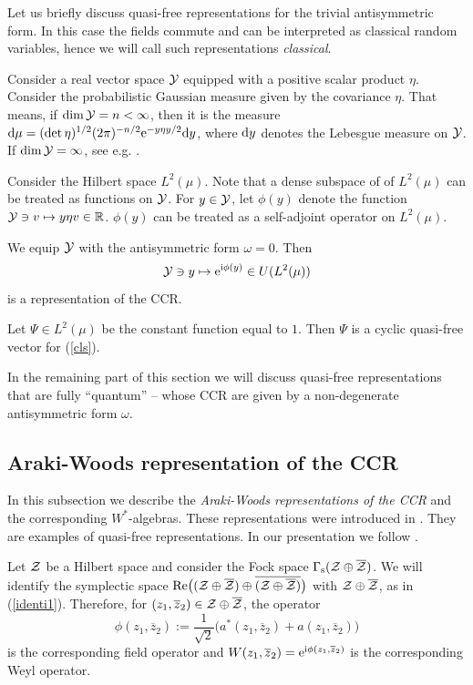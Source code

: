 \documentclass{svmult}
\newcommand{\beq}{\begin{equation}}
\newcommand{\eeq}{\end{equation}}
\def\rr{{\mathbb R}}
\def\Re{{\rm Re}}
\def\bar{\overline}
\def\s{{\rm s}}
\def\cZ{{\cal Z}}
\def\cY{{\cal Y}}
\def\i{{\rm i}}
\def\e{{\rm e}}
\def\d{{\rm d}}
\def\e{{\rm e}}
\def\d{{\rm d}}
\def\s{{\rm s}}
\begin{document}
Let us briefly discuss  quasi-free representations for the trivial
antisymmetric form. In this case the fields commute and can be interpreted as
classical random variables, hence we will call such representations {\em
  classical}. 

Consider a real vector space $\cY$
 equipped with a positive scalar product $\eta$.
 Consider the probabilistic Gaussian measure given by the covariance $\eta$.
That means, if $\dim\cY=n<\infty$, then it is the measure $\d\mu=
(\det\eta)^{1/2}(2\pi)^{-n/2}\e^{-y\eta y/2}\d y$, where $\d y$ denotes the
  Lebesgue measure on $\cY$. If $\dim\cY=\infty$, see e.g. \cite{Si}.



Consider the Hilbert space $L^2(\mu)$. Note that a dense subspace
of of $L^2(\mu)$ can be
treated as functions on $\cY$. For $y\in\cY$, let $\phi(y)$ denote
the function $\cY\ni v\mapsto y\eta v\in\rr$.
 $\phi(y)$ can be treated as a self-adjoint operator on $L^2(\mu)$.


We equip $\cY$ with the antisymmetric form $\omega=0$.
 Then  \beq\cY\ni y\mapsto\e^{\i\phi(y)}\in U(L^2(\mu))\label{cls}\eeq
 is a  representation of the CCR.


Let $\Psi\in L^2(\mu)$ be the constant function equal to
$1$. Then $\Psi$ is a cyclic quasi-free vector for (\ref{cls}).



In the remaining part of this section we will discuss quasi-free
representations that are fully ``quantum'' -- whose CCR
are given by a non-degenerate antisymmetric form $\omega$. 


\subsection{Araki-Woods representation of the CCR}
\label{sAW}

In this subsection we describe the {\em Araki-Woods representations of the
 CCR}
 and the 
corresponding
$W^*$-algebras. These representations were introduced in \cite{AW}.
They are examples of quasi-free representations. 
In our presentation  we follow \cite{DJ2}.

Let $\cZ$ be a Hilbert space and  consider  the Fock space
$\Gamma_\s(\cZ\oplus\bar\cZ)$. 
We will identify the symplectic space
$\Re\bigl((\cZ\oplus\bar\cZ)\oplus\bar{(\cZ\oplus\bar\cZ)}\bigr)$ with
$\cZ\oplus\bar\cZ$, as in (\ref{identi1}).
Therefore,
for $(z_1,\bar
z_2)\in\cZ\oplus\bar\cZ$, 
the operator \[
\phi(z_1,\bar z_2):=\frac1{\sqrt2}\bigl(a^*(z_1,\bar z_2)+a(z_1,\bar
z_2)\bigr)\]
is the corresponding field operator and  $W(z_1,\bar z_2)=\e^{\i\phi
(z_1,\bar z_2)}$ is the corresponding Weyl operator.
\end{document}
